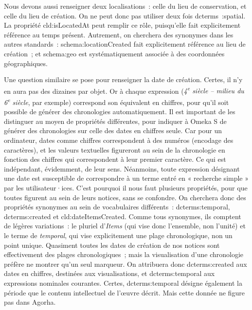 \documentclass[a4paper,12pt, twoside]{book}
\begin{document}
Nous devons aussi renseigner deux localisations~: celle du lieu de conservation, et celle du lieu de création. On ne peut donc pas utiliser deux fois \textsf{dcterms~:spatial}. La propriété \textsf{cld:isLocatedAt} peut remplir ce rôle, puisqu’elle fait explicitement référence au temps présent. Autrement, on cherchera des synonymes dans les autres standards~: \textsf{schema:locationCreated} fait explicitement référence au lieu de création~; et \textsf{schema:geo} est systématiquement associée à des coordonnées géographiques.

Une question similaire se pose pour renseigner la date de création. Certes, il n’y en aura pas des dizaines par objet. Or à chaque expression (\textit{4\textsuperscript{e} siècle – milieu du 6\textsuperscript{e} siècle}, par exemple) correspond son équivalent en chiffres, pour qu’il soit possible de générer des chronologies automatiquement. Il est important de les distinguer au moyen de propriétés différentes, pour indiquer à Omeka S de générer des chronologies sur celle des dates en chiffres seule. Car pour un ordinateur, dates comme chiffres correspondent à des numéros (encodage des caractères), et les valeurs textuelles figureront au sein de la chronologie en fonction des chiffres qui correspondent à leur premier caractère. Ce qui est indépendant, évidemment, de leur sens. Néanmoins, toute expression désignant une date est susceptible de correspondre à un terme entré en « recherche simple » par les utilisateur·ices. C’est pourquoi il nous faut plusieurs propriétés, pour que toutes figurent au sein de leurs notices, sans se confondre. On cherchera donc des propriétés synonymes au sein de vocabulaires différents~: \textsf{dcterms:temporal, dcterms:created} et \textsf{cld:dateItemsCreated}. Comme tous synonymes, ils comptent de légères variations~: le pluriel d’\textit{Items} (qui vise donc l’ensemble, non l’unité) et le terme de \textit{temporal}, qui vise explicitement une plage chronologique, non un point unique. Quasiment toutes les dates de création de nos notices sont effectivement des plages chronologiques~; mais la visualisation d’une chronologie préfère ne montrer qu’un seul marqueur. On attribuera donc \textsf{dcterms:created} aux dates en chiffres, destinées aux visualisations, et \textsf{dcterms:temporal} aux expressions nominales courantes. Certes, \textsf{dcterms:temporal} désigne également la période que le contenu intellectuel de l’œuvre décrit. Mais cette donnée ne figure pas dans Agorha.
\end{document}
